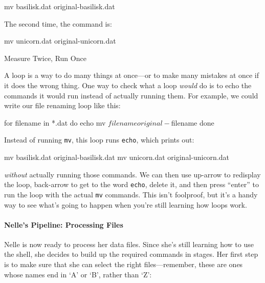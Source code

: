 \documentclass{book}
\begin{document}
\begin{VerbIn}
mv basilisk.dat original-basilisk.dat
\end{VerbIn}

The second time, the command is:

\begin{VerbIn}
mv unicorn.dat original-unicorn.dat
\end{VerbIn}

\begin{swcbox}{Measure Twice, Run Once}

A loop is a way to do many things at once---or to make many mistakes at
once if it does the wrong thing. One way to check what a loop
\emph{would} do is to echo the commands it would run instead of actually
running them. For example, we could write our file renaming loop like
this:

\begin{VerbIn}
for filename in *.dat
do
    echo mv $filename original-$filename
done
\end{VerbIn}

Instead of running \texttt{mv}, this loop runs \texttt{echo}, which
prints out:

\begin{VerbIn}
mv basilisk.dat original-basilisk.dat
mv unicorn.dat original-unicorn.dat
\end{VerbIn}

\emph{without} actually running those commands. We can then use up-arrow
to redisplay the loop, back-arrow to get to the word \texttt{echo},
delete it, and then press ``enter'' to run the loop with the actual
\texttt{mv} commands. This isn't foolproof, but it's a handy way to see
what's going to happen when you're still learning how loops work.

\end{swcbox}

\mbox{}\paragraph{Nelle's Pipeline: Processing Files}

Nelle is now ready to process her data files. Since she's still learning
how to use the shell, she decides to build up the required commands in
stages. Her first step is to make sure that she can select the right
files---remember, these are ones whose names end in `A' or `B', rather
than `Z':

\end{document}
